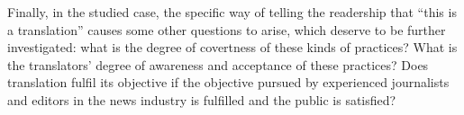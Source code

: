 \documentclass[output=paper]{LSP/langsci}
\begin{document}
Finally, in the studied case, the specific way of telling the readership that ``this is a translation'' causes some other questions to arise, which deserve to be further investigated: what is the degree of covertness of these kinds of practices? What is the translators' degree of awareness and acceptance of these practices? Does translation fulfil its objective if the objective pursued by experienced journalists and editors in the news industry is fulfilled and the public is satisfied? 

\largerpage
\sloppy
\printbibliography[heading=subbibliography,notkeyword=this]
\end{document}
